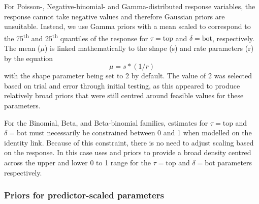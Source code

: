 \documentclass[
  shortnames]{jss}
\begin{document}
For Poisson-, Negative-binomial- and Gamma-distributed response variables, the response cannot take negative values and therefore Gaussian priors are unsuitable. Instead, we use Gamma priors with a mean scaled to correspond to the 75\textsuperscript{th} and 25\textsuperscript{th} quantiles of the response for \(\tau = \text{top}\) and \(\delta = \text{bot}\), respectively. The mean (\(\mu\)) is linked mathematically to the shape (s) and rate parameters (r) by the equation \[ \mu = s * (1/r) \] \citep{Becker1988} with the shape parameter being set to 2 by default. The value of 2 was selected based on trial and error through initial testing, as this appeared to produce relatively broad priors that were still centred around feasible values for these parameters.

For the Binomial, Beta, and Beta-binomial families, estimates for \(\tau = \text{top}\) and \(\delta = \text{bot}\) must necessarily be constrained between 0 and 1 when modelled on the identity link. Because of this constraint, there is no need to adjust scaling based on the response. In this case  uses  and  priors to provide a broad density centred across the upper and lower 0 to 1 range for the \(\tau = \text{top}\) and \(\delta = \text{bot}\) parameters respectively.

\hypertarget{priors-for-predictor-scaled-parameters}{%
\subsubsection{Priors for predictor-scaled parameters}\label{priors-for-predictor-scaled-parameters}}
\end{document}
